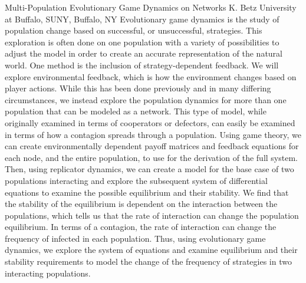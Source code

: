 
    \begin{abstract_online}{Multi-Population Evolutionary Game Dynamics on Networks}{%
        K. Betz}{%
        }{%
        University at Buffalo, SUNY, Buffalo, NY}
    Evolutionary game dynamics is the study of population change based on successful, or unsuccessful, strategies.  This exploration is often done on one population with a variety of possibilities to adjust the model in order to create an accurate representation of the natural world.  One method is the inclusion of strategy-dependent feedback.  We will explore environmental feedback, which is how the environment changes based on player actions.  While this has been done previously and in many differing circumstances, we instead explore the population dynamics for more than one population that can be modeled as a network.  This type of model, while originally examined in terms of cooperators or defectors, can easily be examined in terms of how a contagion spreads through a population. Using game theory, we can create environmentally dependent payoff matrices and feedback equations for each node, and the entire population, to use for the derivation of the full system.  Then, using replicator dynamics, we can create a model for the base case of two populations interacting and explore the subsequent system of differential equations to examine the possible equilibrium and their stability.  We find that the stability of the equilibrium is dependent on the interaction between the populations, which tells us that the rate of interaction can change the population equilibrium.  In terms of a contagion, the rate of interaction can change the frequency of infected in each population.  Thus, using evolutionary game dynamics, we explore the system of equations and examine equilibrium and their stability requirements to model the change of the frequency of strategies in two interacting populations. 
    
    \end{abstract_online}
    